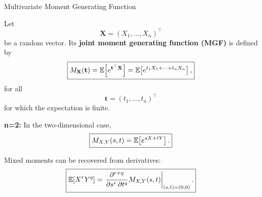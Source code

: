 \begin{frame}{Multivariate Moment Generating Function}

Let
$$
\mathbf X=(X_1,\dots,X_n)^\top
$$
be a random vector. Its \textbf{joint moment generating function (MGF)} is defined by
$$
\boxed{
M_{\mathbf X}(\mathbf t)
=
\mathbb{E}\!\left[e^{\mathbf t^\top \mathbf X}\right]
=
\mathbb{E}\!\left[
e^{t_1X_1+\cdots+t_nX_n}
\right],
}
$$
for all
$$
\mathbf t=(t_1,\dots,t_n)^\top
$$
for which the expectation is finite.

\textbf{n=2: }In the two-dimensional case,
$$
\boxed{
M_{X,Y}(s,t)
=
\mathbb{E}\!\left[e^{sX+tY}\right].
}
$$

Mixed moments can be recovered from derivatives:
$$
\boxed{
\mathbb{E}[X^rY^q]
=
\left.
\frac{\partial^{r+q}}
{\partial s^r\,\partial t^q}
M_{X,Y}(s,t)
\right|_{(s,t)=(0,0)}.
}
$$

\end{frame}






